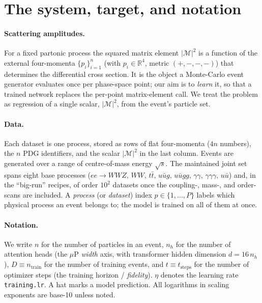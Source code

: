 \documentclass[11pt]{article}
\newcommand{\R}{\mathbb{R}}
\newcommand{\abs}[1]{\left\lvert #1 \right\rvert}
\newcommand{\Mamp}{\mathcal{M}}
\newcommand{\amp}{\abs{\Mamp}^2}
\newcommand{\nh}{n_h}
\newcommand{\code}[1]{\texttt{#1}}
\begin{document}
\tableofcontents

\section{The system, target, and notation}\label{sec:system}

\paragraph{Scattering amplitudes.} For a fixed partonic process the squared matrix
element $\amp$ is a function of the external four-momenta $\{p_i\}_{i=1}^{n}$ (with
$p_i\in\R^{4}$, metric $(+,-,-,-)$) that determines the differential cross section. It
is the object a Monte-Carlo event generator evaluates once per phase-space point; our
aim is to \emph{learn} it, so that a trained network replaces the per-point matrix-element
call. We treat the problem as regression of a single scalar, $\amp$, from the event's
particle set.

\paragraph{Data.} Each dataset is one process, stored as rows of flat four-momenta
($4n$ numbers), the $n$ PDG identifiers, and the scalar $\amp$ in the last column.
Events are generated over a range of centre-of-mass energy $\sqrt s$. The maintained
joint set spans eight base processes ($ee\!\to\!WWZ,\,WW,\,t\bar t,\,u\bar ug,\,
u\bar ugg,\,\gamma\gamma,\,\gamma\gamma\gamma,\,u\bar u$) and, in the ``big-run'' recipes,
of order $10^{2}$ datasets once the coupling-, mass-, and order-scans are included. A
\emph{process} (or \emph{dataset}) index $p\in\{1,\dots,P\}$ labels which physical
process an event belongs to; the model is trained on all of them at once.

\paragraph{Notation.} We write $n$ for the number of particles in an event, $\nh$ for the
number of attention heads (the $\mu$P \emph{width} axis, with transformer hidden dimension
$d=16\,\nh$), $D\equiv n_{\mathrm{train}}$ for the number of training events, and
$t\equiv t_{\mathrm{steps}}$ for the number of optimizer steps (the training horizon /
\emph{fidelity}). $\eta$ denotes the learning rate \code{training.lr}. A hat marks a
model prediction. All logarithms in scaling exponents are base-10 unless noted.
\end{document}
